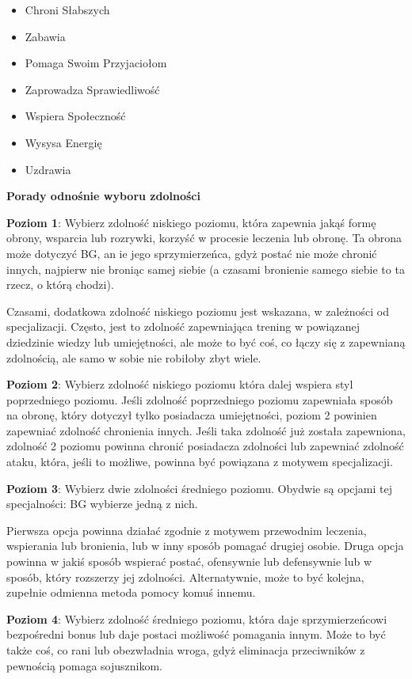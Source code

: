 \begin{itemize}
\item Chroni Słabszych
\item Zabawia
\item Pomaga Swoim Przyjaciołom
\item Zaprowadza Sprawiedliwość
\item Wspiera Społeczność
\item Wysysa Energię
\item Uzdrawia
\end{itemize}

\textbf{Porady odnośnie wyboru zdolności}

\textbf{Poziom 1}: Wybierz zdolność niskiego poziomu, która zapewnia jakąś formę obrony, wsparcia lub rozrywki, korzyść w procesie leczenia lub obronę. Ta obrona może dotyczyć BG, an ie jego sprzymierzeńca, gdyż postać nie może chronić innych, najpierw nie broniąc samej siebie (a czasami bronienie samego siebie to ta rzecz, o którą chodzi).

Czasami, dodatkowa zdolność niskiego poziomu jest wskazana, w zależności od specjalizacji. Często, jest to zdolność zapewniająca trening w powiązanej dziedzinie wiedzy lub umiejętności, ale może to być coś, co łączy się z zapewnianą zdolnością, ale samo w sobie nie robiłoby zbyt wiele.

\textbf{Poziom 2}: Wybierz zdolność niskiego poziomu która dalej wspiera styl poprzedniego poziomu. Jeśli zdolność poprzedniego poziomu zapewniała sposób na obronę, który dotyczył tylko posiadacza umiejętności, poziom 2 powinien zapewniać zdolność chronienia innych. Jeśli taka zdolność już została zapewniona, zdolność 2 poziomu powinna chronić posiadacza zdolności lub zapewniać zdolność ataku, która, jeśli to możliwe, powinna być powiązana z motywem specjalizacji.

\textbf{Poziom 3}: Wybierz dwie zdolności średniego poziomu. Obydwie są opcjami tej specjalności: BG wybierze jedną z nich.

Pierwsza opcja powinna działać zgodnie z motywem przewodnim leczenia, wspierania lub bronienia, lub w inny sposób pomagać drugiej osobie. Druga opcja powinna w jakiś sposób wspierać postać, ofensywnie lub defensywnie lub w sposób, który rozszerzy jej zdolności. Alternatywnie, może to być kolejna, zupełnie odmienna metoda pomocy komuś innemu.

\textbf{Poziom 4}: Wybierz zdolność średniego poziomu, która daje sprzymierzeńcowi bezpośredni bonus lub daje postaci możliwość pomagania innym. Może to być także coś, co rani lub obezwładnia wroga, gdyż eliminacja przeciwników z pewnością pomaga sojusznikom.

